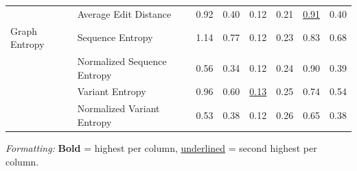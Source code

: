 \begin{table}[H]
\begin{tabular}{llcccccc}
              & Average Edit Distance & 0.92 & 0.40 & 0.12 & 0.21 & \underline{0.91} & 0.40 \\
Graph Entropy & Sequence Entropy & 1.14 & 0.77 & 0.12 & 0.23 & 0.83 & 0.68 \\
              & Normalized Sequence Entropy & 0.56 & 0.34 & 0.12 & 0.24 & 0.90 & 0.39 \\
              & Variant Entropy & 0.96 & 0.60 & \underline{0.13} & 0.25 & 0.74 & 0.54 \\
              & Normalized Variant Entropy & 0.53 & 0.38 & 0.12 & 0.26 & 0.65 & 0.38 \\
\bottomrule
\end{tabular}
\vspace{2pt}
\begin{minipage}{\linewidth}
\centering
\scriptsize
\tiny
\textit{Formatting:} \textbf{Bold} = highest per column, \underline{underlined} = second highest per column.
\end{minipage}
\end{table}
